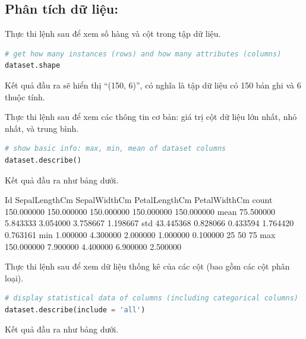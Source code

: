 \subsection{Phân tích dữ liệu:}

Thực thi lệnh sau để xem số hàng và cột trong tập dữ liệu.

\begin{lstlisting}[language=Python]
# get how many instances (rows) and how many attributes (columns)
dataset.shape
\end{lstlisting}

Kết quả đầu ra sẽ hiển thị \enquote{(150, 6)}, có nghĩa là tập dữ liệu
có 150 bản ghi và 6 thuộc tính.

Thực thi lệnh sau để xem các thông tin cơ bản:
giá trị cột dữ liệu lớn nhất, nhỏ nhất, và trung bình.

\begin{lstlisting}[language=Python]
# show basic info: max, min, mean of dataset columns
dataset.describe()
\end{lstlisting}

Kết quả đầu ra như bảng dưới.

\begin{terminaloutput}
      Id         SepalLengthCm SepalWidthCm PetalLengthCm PetalWidthCm
count 150.000000 150.000000    150.000000   150.000000    150.000000
mean  75.500000  5.843333      3.054000     3.758667      1.198667
std   43.445368  0.828066      0.433594     1.764420      0.763161
min   1.000000   4.300000      2.000000     1.000000      0.100000
25%
50%
75%
max   150.000000 7.900000      4.400000     6.900000      2.500000
\end{terminaloutput}

Thực thi lệnh sau để xem dữ liệu thống kê của các cột (bao gồm các cột phân loại).

\begin{lstlisting}[language=Python]
# display statistical data of columns (including categorical columns)
dataset.describe(include = 'all')
\end{lstlisting}

Kết quả đầu ra như bảng dưới.

